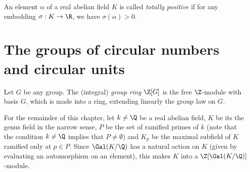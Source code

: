 \iffalse
\begin{lemma}\label{comp}
We have $kK_iK_jK_l=K$ and $K_1K_2K_3K_4=K$.
\end{lemma}
\begin{proof}
The extension $K/K_iK_jK_l$ is totally ramified at the prime ideals above $p_h$, so the same must be true for the extension $K/kK_iK_jK_l$. But since the extension $K/k$ is unramified (by the definition of $K$), so is $K/kK_iK_jK_l$. Therefore $[K:kK_iK_jK_l]=1$. The second claim follows from the facts %
$T_i=\Gal(K/K_jK_lK_h)$ and $G=T_1\times T_2\times T_3\times T_4$.
\end{proof}
\begin{center}
\begin{tikzpicture}
  \node (a) at (0,4)  {$K$};
  \node (b) at (0,2)  {$kK_iK_jK_l$};
  \node (c) at (-3,1)  {$k$};
  \node (d) at (3,1)  {$K_iK_jK_l$};
  \draw[transform canvas={xshift=-1.5pt}] (a) -- (b);
  \draw[transform canvas={xshift=1.5pt}] (b) -- (a);
  \draw   (b) --  (c)
   (b) -- (d);
  \draw[bend left](c) to node [above , sloped]{\text{unramified}}(a);
  \draw[bend right](d) to node [above , sloped]{\text{totally ramified above $p_h$}}(a);
\end{tikzpicture}
\end{center}
\fi

\begin{definition}
An element $\alpha$ of a real abelian field $K$ is called \textit{totally positive} if for any embedding $\sigma: K\to \R$, we have $\sigma(\alpha)>0$.
\end{definition}

\section{The groups of circular numbers and circular units}
\begin{definition}
Let $G$ be any group. The (integral) \textit{group ring} $\Z[G]$ is the free $\Z$-module with basis $G$, which is made into a ring, extending linearly the group law on $G$.
\end{definition}

For the remainder of this chapter, let $k\neq \Q$ be a real abelian field, $K$ be its the genus field in the narrow sense, $P$ be the set of ramified primes of $k$ (note that the condition $k\neq \Q$ implies that $P\neq \emptyset$) and $K_p$ be the maximal subfield of $K$ ramified only at $p\in P$. Since $\Gal(K/\Q)$ has a natural action on $K$ (given by evaluating an automorphism on an element), this makes $K$ into a $\Z[\Gal(K/\Q)]$-module. 

